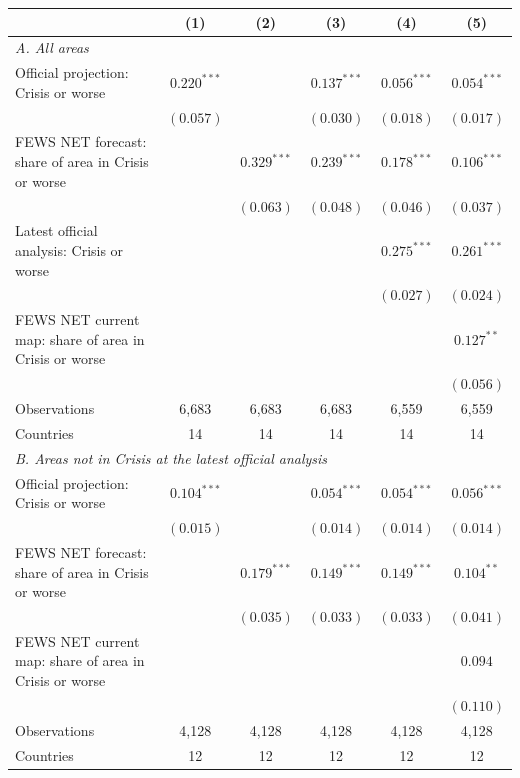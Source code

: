\begin{tabular}{lccccc}
\toprule
 & (1) & (2) & (3) & (4) & (5) \\
\midrule
\multicolumn{6}{l}{\textit{A. All areas}} \\
Official projection: Crisis or worse & $0.220^{***}$ &  & $0.137^{***}$ & $0.056^{***}$ & $0.054^{***}$ \\
 & $(0.057)$ &  & $(0.030)$ & $(0.018)$ & $(0.017)$ \\
FEWS NET forecast: share of area in Crisis or worse &  & $0.329^{***}$ & $0.239^{***}$ & $0.178^{***}$ & $0.106^{***}$ \\
 &  & $(0.063)$ & $(0.048)$ & $(0.046)$ & $(0.037)$ \\
Latest official analysis: Crisis or worse &  &  &  & $0.275^{***}$ & $0.261^{***}$ \\
 &  &  &  & $(0.027)$ & $(0.024)$ \\
FEWS NET current map: share of area in Crisis or worse &  &  &  &  & $0.127^{**}$ \\
 &  &  &  &  & $(0.056)$ \\
Observations & 6,683 & 6,683 & 6,683 & 6,559 & 6,559 \\
Countries & 14 & 14 & 14 & 14 & 14 \\
\midrule
\multicolumn{6}{l}{\textit{B. Areas not in Crisis at the latest official analysis}} \\
Official projection: Crisis or worse & $0.104^{***}$ &  & $0.054^{***}$ & $0.054^{***}$ & $0.056^{***}$ \\
 & $(0.015)$ &  & $(0.014)$ & $(0.014)$ & $(0.014)$ \\
FEWS NET forecast: share of area in Crisis or worse &  & $0.179^{***}$ & $0.149^{***}$ & $0.149^{***}$ & $0.104^{**}$ \\
 &  & $(0.035)$ & $(0.033)$ & $(0.033)$ & $(0.041)$ \\
FEWS NET current map: share of area in Crisis or worse &  &  &  &  & $0.094$ \\
 &  &  &  &  & $(0.110)$ \\
Observations & 4,128 & 4,128 & 4,128 & 4,128 & 4,128 \\
Countries & 12 & 12 & 12 & 12 & 12 \\
\bottomrule
\end{tabular}